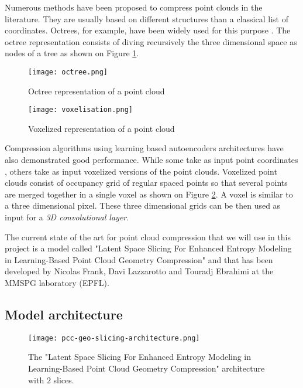 \label{sec:pcc}

Numerous methods have been proposed to compress point clouds in the literature. They are usually based on different structures than a classical list of coordinates.                                
Octrees, for example, have been widely used for this purpose \cite{bib:octree}. 
The octree representation consists of diving recursively the three dimensional space as nodes of a tree as shown on Figure \ref{fig:octree}.

\begin{figure}
    \centering
    \texttt{[image: octree.png]}
    \caption{Octree representation of a point cloud}
    \label{fig:octree}
\end{figure}

\begin{figure}
    \centering
    \texttt{[image: voxelisation.png]}
    \caption{Voxelized representation of a point cloud}
    \label{fig:voxelized}
\end{figure}

Compression algorithms using learning based autoencoders architectures have also demonstrated good performance. While some take as input point coordinates \cite{bib:9102866}, others take as input voxelized versions of the point clouds. 
Voxelized point clouds consist of occupancy grid of regular spaced points so that several points are merged together in a single voxel as shown on Figure \ref{fig:voxelized}.
A voxel is similar to a three dimensional pixel.
These three dimensional grids can be then used as input for a \textit{3D convolutional layer}.


The current state of the art for point cloud compression that we will use in this project is a model called "Latent Space Slicing For Enhanced Entropy Modeling in Learning-Based Point Cloud Geometry Compression" and that has been developed by Nicolas Frank, Davi Lazzarotto and Touradj Ebrahimi at the MMSPG laboratory (EPFL).

\subsection{Model architecture}

\begin{figure}
    \centering
    \texttt{[image: pcc-geo-slicing-architecture.png]}
    \caption{The "Latent Space Slicing For Enhanced Entropy Modeling in Learning-Based Point Cloud Geometry Compression" architecture with $2$ slices.}
    \label{fig:pcc-geo-slicing-architecture}
\end{figure}

